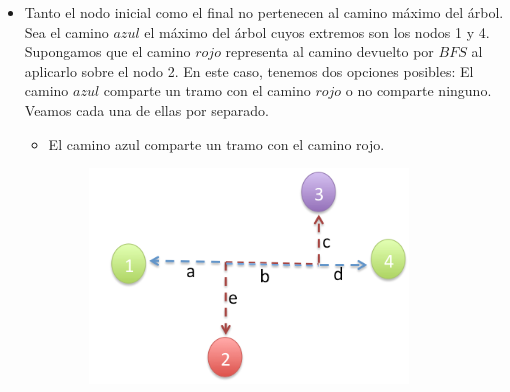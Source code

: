\begin{itemize}
\begin {itemize}
A partir del gráfico anterior, supongamos que el camino rojo representa al máximo que resulta del algoritmo $BFS$ luego de haberlo aplicado sobre el nodo 2. \newline
Por otro lado, supongamos que dicho algoritmo retorna al nodo 3 como el más lejano del 2. Como el nodo 3 se encuentra más lejos del 2 que el 1, $b \geq a$. 
\begin{itemize}
\item $a$ = $b$: \newline En este caso, ambos caminos hubieran sido correctos ya que dist(4,1) sería igual a dist(4,3). 
\item $a<b$: \newline Si este caso sucediera, $b$ debería formar parte del camino máximo del árbol. Esto se debe a que el camino más largo del árbol debe estar conformado por los caminos $c$-$d$ y el máximo entre $a$ y $b$. Por lo tanto, si $b>a$, el camino azul no sería el máximo. Luego, es absurdo suponer que el extremo del camino máximo retornado por $BFS$ no pertencía al camino máximo del árbol.\newline
\end{itemize}
\item Tanto el nodo inicial como el final no pertenecen al camino máximo del árbol. \newline \newline
Sea el camino $azul$ el máximo del árbol cuyos extremos son los nodos 1 y 4. Supongamos que el camino $rojo$ representa al camino devuelto por $BFS$ al aplicarlo sobre el nodo 2. En este caso, tenemos dos opciones posibles: El camino $azul$ comparte un tramo con el camino $rojo$ o no comparte ninguno. Veamos cada una de ellas por separado. \newline
\begin{itemize}
\item El camino azul comparte un tramo con el camino rojo. \newline
\begin{figure}[H] %
\begin{minipage}[H]{240pt}
\includegraphics[width=240pt]{../imgs/ej2casos01.jpg}

\end{minipage}
\end{figure}
\end{itemize}
\end{itemize}
\end{itemize}
